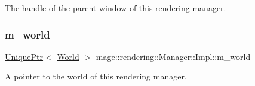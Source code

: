 The handle of the parent window of this rendering manager. \hypertarget{classmage_1_1rendering_1_1_manager_1_1_impl_ad262b9528ae867db6fe8b93b8de54cf1}{}\label{classmage_1_1rendering_1_1_manager_1_1_impl_ad262b9528ae867db6fe8b93b8de54cf1} 
\subsubsection{\texorpdfstring{m\+\_\+world}{m\_world}}
{\footnotesize\ttfamily \hyperlink{namespacemage_a3316d7143a973e37adf1110f2e80ca31}{Unique\+Ptr}$<$ \hyperlink{classmage_1_1rendering_1_1_world}{World} $>$ mage\+::rendering\+::\+Manager\+::\+Impl\+::m\+\_\+world\hspace{0.3cm}{\ttfamily [private]}}

A pointer to the world of this rendering manager. 
